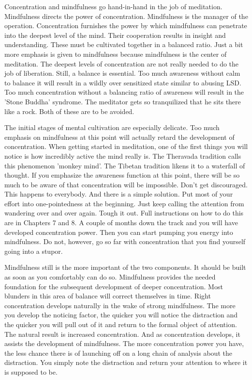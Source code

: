 Concentration and mindfulness go hand-in-hand in the job of meditation.
Mindfulness directs the power of concentration.
Mindfulness is the manager of the operation. Concentration furnishes the power by which mindfulness can penetrate into the
deepest level of the mind. Their cooperation results in insight and understanding. These must be cultivated together in a balanced
ratio. Just a bit more emphasis is given to mindfulness because mindfulness is the center of meditation. The deepest levels of
concentration are not really needed to do the job of liberation. Still, a balance is essential. Too much awareness without calm to
balance it will result in a wildly over sensitized state similar to abusing LSD. Too much concentration without a balancing ratio
of awareness will result in the 'Stone Buddha' syndrome. The meditator gets so tranquilized that he sits there like a rock. Both of
these are to be avoided.

The initial stages of mental cultivation are especially delicate. Too much
emphasis on mindfulness at this point will actually retard the development of
concentration. When getting started in meditation, one of the first things you
will notice is how incredibly active the mind really is. The Theravada tradition
calls this phenomenon 'monkey mind'. The Tibetan tradition likens it to a
waterfall of thought. If you emphasize the awareness function at this point,
there will be so much to be aware of that concentration will be impossible.
Don't get discouraged. This happens to everybody. And there is a simple
solution. Put most of your effort into one-pointedness at the beginning. Just
keep calling the attention from wandering over and over again. Tough it out.
Full instructions on how to do this are in Chapters 7 and 8. A couple of months
down the track and you will have developed concentration power. Then you can start pumping you energy into mindfulness. Do
not, however, go so far with concentration that you find yourself going into a
stupor.

Mindfulness still is the more important of the two components. It should be
built as soon as you comfortably can do so.
Mindfulness provides the needed foundation for the subsequent development of deeper concentration. Most blunders in this area of
balance will correct themselves in time. Right concentration develops naturally in the wake of strong mindfulness. The more you
develop the noticing factor, the quicker you will notice the distraction and the quicker you will pull out of it and return to the
formal object of attention. The natural result is increased concentration. And as concentration develops, it assists the development
of mindfulness. The more concentration power you have, the less chance there is of launching off on a long chain of analysis about
the distraction. You simply note the distraction and return your attention to where it is supposed to be.

